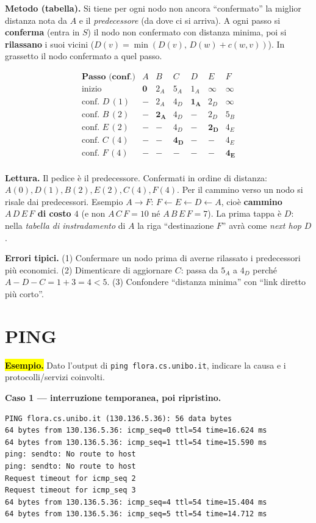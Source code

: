 \documentclass[11pt,a4paper]{report}
\begin{document}
\textbf{Metodo (tabella).} Si tiene per ogni nodo non ancora ``confermato'' la
miglior distanza nota da $A$ e il \emph{predecessore} (da dove ci si arriva). A
ogni passo si \textbf{conferma} (entra in $S$) il nodo non confermato con
distanza minima, poi si \textbf{rilassano} i suoi vicini
($D(v)=\min(D(v),\,D(w)+c(w,v))$). In grassetto il nodo confermato a quel passo.

\[
\begin{array}{c|cccccc}
\textbf{Passo (conf.)} & A & B & C & D & E & F \\ \hline
\text{inizio} & \mathbf{0} & 2_A & 5_A & 1_A & \infty & \infty \\
\text{conf. } D\,(1) & - & 2_A & 4_D & \mathbf{1_A} & 2_D & \infty \\
\text{conf. } B\,(2) & - & \mathbf{2_A} & 4_D & - & 2_D & 5_B \\
\text{conf. } E\,(2) & - & - & 4_D & - & \mathbf{2_D} & 4_E \\
\text{conf. } C\,(4) & - & - & \mathbf{4_D} & - & - & 4_E \\
\text{conf. } F\,(4) & - & - & - & - & - & \mathbf{4_E} \\
\end{array}
\]

\textbf{Lettura.} Il pedice è il predecessore. Confermati in ordine di distanza:
$A(0),D(1),B(2),E(2),C(4),F(4)$. Per il cammino verso un nodo si risale dai
predecessori. Esempio $A\to F$: $F\!\leftarrow\!E\!\leftarrow\!D\!\leftarrow\!A$,
cioè \textbf{cammino $A\,D\,E\,F$ di costo $4$} (e non $A\,C\,F=10$ né
$A\,B\,E\,F=7$). La prima tappa è $D$: nella \emph{tabella di instradamento} di
$A$ la riga ``destinazione $F$'' avrà come \emph{next hop} $D$.

\textbf{Errori tipici.} (1) Confermare un nodo prima di averne rilassato i
predecessori più economici. (2) Dimenticare di aggiornare $C$: passa da $5_A$ a
$4_D$ perché $A\!-\!D\!-\!C=1+3=4<5$. (3) Confondere ``distanza minima'' con
``link diretto più corto''.


\section{PING}
\label{teoria:ping}
\hl{\textbf{Esempio.}} Dato l'output di
\texttt{ping flora.cs.unibo.it}, indicare la causa e i protocolli/servizi
coinvolti.

\medskip
\textbf{Caso 1 --- interruzione temporanea, poi ripristino.}
\begin{verbatim}
PING flora.cs.unibo.it (130.136.5.36): 56 data bytes
64 bytes from 130.136.5.36: icmp_seq=0 ttl=54 time=16.624 ms
64 bytes from 130.136.5.36: icmp_seq=1 ttl=54 time=15.590 ms
ping: sendto: No route to host
ping: sendto: No route to host
Request timeout for icmp_seq 2
Request timeout for icmp_seq 3
64 bytes from 130.136.5.36: icmp_seq=4 ttl=54 time=15.404 ms
64 bytes from 130.136.5.36: icmp_seq=5 ttl=54 time=14.712 ms
\end{verbatim}
\end{document}
